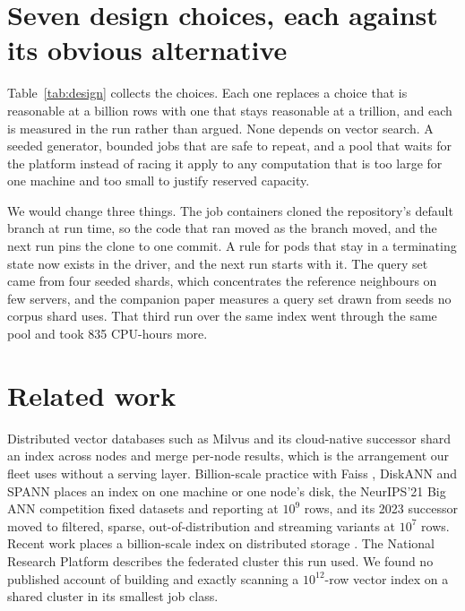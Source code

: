 \documentclass[sigconf, nonacm]{acmart}
\begin{document}
\section{Seven design choices, each against its obvious alternative}
\label{sec:lessons}

Table~\ref{tab:design} collects the choices. Each one replaces a choice that is reasonable at a
billion rows with one that stays reasonable at a trillion, and each is measured in the run rather
than argued. None depends on vector search. A seeded generator, bounded jobs that are safe to
repeat, and a pool that waits for the platform instead of racing it apply to any computation that
is too large for one machine and too small to justify reserved capacity.

We would change three things. The job containers cloned the repository's default branch at run
time, so the code that ran moved as the branch moved, and the next run pins the clone to one
commit. A rule for pods that stay in a terminating state now exists in the driver, and the next
run starts with it. The query set came from four seeded shards, which concentrates the reference
neighbours on few servers, and the companion paper measures a query set drawn from seeds no
corpus shard uses. That third run over the same index went through the same pool and took 835
CPU-hours more.

\section{Related work}

Distributed vector databases such as Milvus \cite{wang2021milvus} and its cloud-native successor
\cite{guo2022manu} shard an index across nodes and merge per-node results, which is the arrangement
our fleet uses without a serving layer. Billion-scale practice with Faiss
\cite{johnson2019faiss,douze2024faiss}, DiskANN \cite{subramanya2019diskann} and SPANN
\cite{chen2021spann} places an index on one machine or one node's disk, the NeurIPS'21 Big ANN
competition \cite{simhadri2022bigann} fixed datasets and reporting at $10^{9}$ rows, and its 2023
successor \cite{simhadri2024bigann23} moved to filtered, sparse, out-of-distribution and
streaming variants at $10^{7}$ rows. Recent work places a billion-scale index on distributed storage \cite{yu2025dsann}.
The National Research Platform \cite{weitzel2025nrp} describes the federated cluster this run used.
We found no published account of building and exactly scanning a $10^{12}$-row vector index on a
shared cluster in its smallest job class.
\end{document}
